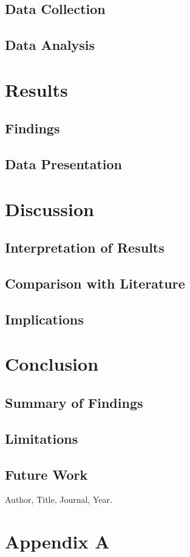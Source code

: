 \documentclass[12pt,a4paper]{report}
\begin{document}
\section{Data Collection}
\section{Data Analysis}

\chapter{Results}
\section{Findings}
\section{Data Presentation}

\chapter{Discussion}
\section{Interpretation of Results}
\section{Comparison with Literature}
\section{Implications}

\chapter{Conclusion}
\section{Summary of Findings}
\section{Limitations}
\section{Future Work}

\begin{thebibliography}{99}
 Author, Title, Journal, Year.
\end{thebibliography}

\appendix
\chapter{Appendix A}
\lipsum[2] 
\end{document}
